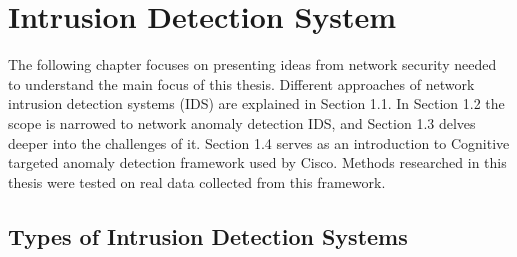 \documentclass[thesis=B,english]{FITthesis}[2012/10/20]
\begin{document}


\chapter{Intrusion Detection System}

The following chapter focuses on presenting ideas from network security needed to understand the main focus of this thesis.
Different approaches of network intrusion detection systems (IDS) are explained in Section 1.1.
In Section 1.2 the scope is narrowed to network anomaly detection IDS, and Section 1.3 delves deeper into the challenges of it.
Section 1.4 serves as an introduction to Cognitive targeted anomaly detection framework used by Cisco.
Methods researched in this thesis were tested on real data collected from this framework. \\
                                                                                  
\section{Types of Intrusion Detection Systems}                                    
                                                                                  
\end{document}
